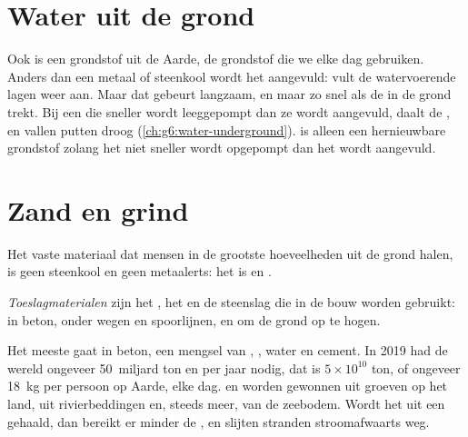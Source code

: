 \section{Water uit de grond}

Ook  is een grondstof uit de Aarde, de grondstof die we elke dag
gebruiken. Anders dan een metaal of steenkool wordt het aangevuld: 
vult de watervoerende lagen weer aan. Maar dat gebeurt langzaam, en maar
zo snel als de  in de grond trekt. Bij een  die
sneller wordt leeggepompt dan ze wordt aangevuld, daalt de
, en vallen putten droog (\cref{ch:g6:water-underground}).
 is alleen een hernieuwbare grondstof zolang het niet sneller
wordt opgepompt dan het wordt aangevuld.

\section{Zand en grind}

Het vaste materiaal dat mensen in de grootste hoeveelheden uit de grond
halen, is geen steenkool en geen metaalerts: het is  en .

\begin{definition}[Toeslagmateriaal]\label{def:g9:earth-resources:aggregate}
\emph{Toeslagmaterialen} zijn het , het 
en de steenslag die in de bouw worden gebruikt: in beton, onder wegen en
spoorlijnen, en om de grond op te hogen.
\end{definition}

Het meeste  gaat in beton, een mengsel van , , water en
cement. In 2019 had de wereld ongeveer 50~miljard ton  en  per
jaar nodig, dat is $5 \times 10^{10}$ ton, of ongeveer \qty{18}{kg} per
persoon op Aarde, elke dag.  en  worden gewonnen uit groeven op
het land, uit rivierbeddingen en, steeds meer, van de zeebodem. Wordt het
uit een  gehaald, dan bereikt er minder  de , en slijten
stranden stroomafwaarts weg.

